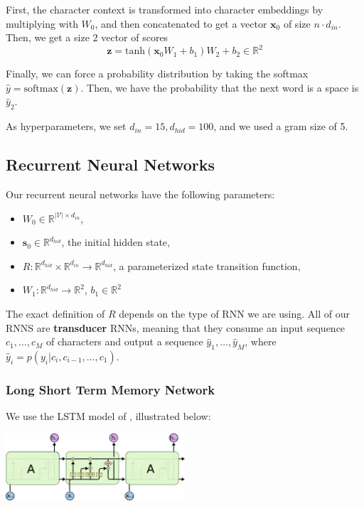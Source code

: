 \documentclass[11pt]{article}
\begin{document}
First, the character context is transformed into character embeddings by multiplying with $W_0$, and then concatenated to get a vector $\mathbf{x}_0$ of size $n \cdot d_{in}$. Then, we get a size $2$ vector of scores
$$\mathbf{z} = \text{tanh}(\mathbf{x}_0W_1 + b_1)W_2 + b_2 \in \mathbb{R}^2$$

Finally, we can force a probability distribution by taking the softmax $\hat{y} = \text{softmax}(\mathbf{z})$. Then, we have the probability that the next word is a space is $\hat{y}_2$.

As hyperparameters, we set $d_{in} = 15, d_{hid} = 100$, and we used a gram size of 5.

\subsection{Recurrent Neural Networks}

Our recurrent neural networks have the following parameters:
\begin{itemize}
  \item $W_0 \in \mathbb{R}^{|\mathcal{V}| \times d_{in}}$,
  \item $\mathbf{s}_0 \in \mathbb{R}^{d_{hid}}$, the initial hidden state,
  \item $R: \mathbb{R}^{d_{hid}} \times \mathbb{R}^{d_{in}} \to \mathbb{R}^{d_{hid}}$, a parameterized state transition function,
  \item $W_1: \mathbb{R}^{d_{hid}} \to \mathbb{R}^2$, $b_1 \in \mathbb{R}^{2}$
\end{itemize}

The exact definition of $R$ depends on the type of RNN we are using. All of our RNNS are \textbf{transducer} RNNs, meaning that they consume an input sequence $c_1, \dots, c_M$ of characters and output a sequence $\hat{y}_1, \dots, \hat{y}_M$, where $\hat{y}_i = p(y_i | c_i, c_{i-1}, \dots, c_1)$. 

\subsubsection{Long Short Term Memory Network}

We use the LSTM model of \cite{hochreiter1997lstm}, illustrated below:

\begin{center}
  \includegraphics[width=0.5\textwidth]{LSTM3-chain.png}
\end{center}
\end{document}
